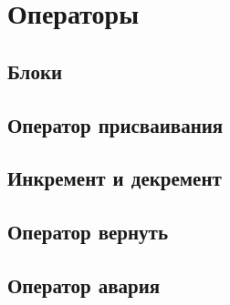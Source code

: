 \hypertarget{statements}{%
\section{Операторы}\label{stmt:chapter}}

\hypertarget{blocks}{%
\subsection{Блоки}\label{stmt:blocks}}

\hypertarget{assignment}{%
\subsection{Оператор присваивания}\label{stmt:assignment}}

\hypertarget{inc-dec}{%
\subsection{Инкремент и декремент}\label{stmt:inc-dec}}

\hypertarget{return}{%
\subsection{Оператор вернуть}\label{stmt:return}}

\hypertarget{crash}{%
\subsection{Оператор авария}\label{stmt:crash}}
